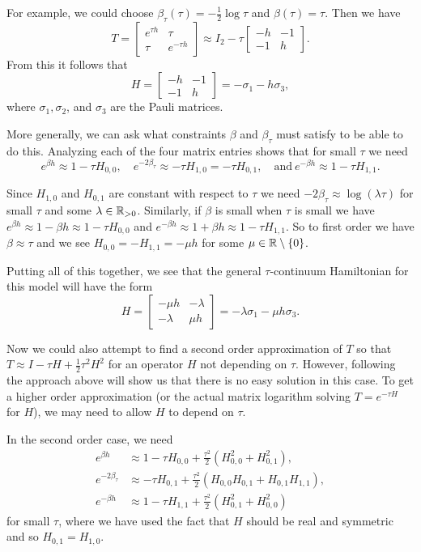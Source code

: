 \documentclass[11pt,reqno]{amsart}
\begin{document}
	For example, we could choose $\beta_\tau(\tau)=-\frac{1}{2}\log \tau$ and $\beta(\tau)=\tau$. Then we have \[T=\begin{bmatrix}
	e^{\tau h} & \tau \\
	\tau & e^{-\tau h}
	\end{bmatrix} \approx I_2-\tau\begin{bmatrix}
	-h & -1 \\
	-1 & h
	\end{bmatrix}.\] 
	From this it follows that \[H=\begin{bmatrix}
	-h & -1 \\
	-1 & h
	\end{bmatrix}=-\sigma_1-h\sigma_3, \] where $\sigma_1,\sigma_2$, and $\sigma_3$ are the Pauli matrices. 
	
	More generally, we can ask what constraints $\beta$ and $\beta_\tau$ must satisfy to be able to do this. 
	Analyzing each of the four matrix entries shows that for small $\tau$ we need 
	\[e^{\beta h} \approx 1-\tau H_{0,0}, \quad e^{-2\beta_\tau} \approx -\tau H_{1,0}=-\tau H_{0,1},\quad \text{and} \ e^{-\beta h} \approx 1- \tau H_{1,1}. \]
	
	Since $H_{1,0}$ and $H_{0,1}$ are constant with respect to $\tau$ we need $-2\beta_\tau \approx \log (\lambda\tau)$ for small $\tau$ and some $\lambda\in \mathbb{R}_{>0}$. 
	Similarly, if $\beta$ is small when $\tau$ is small we have $e^{\beta h} \approx 1-\beta h \approx 1-\tau H_{0,0}$ and $e^{-\beta h} \approx 1+\beta h \approx 1-\tau H_{1,1}$. 
	So to first order we have $\beta \approx \tau$ and we see $H_{0,0}=-H_{1,1}=-\mu h$ for some $\mu \in \mathbb{R}\setminus\{0\}$. 
	
	Putting all of this together, we see that the general $\tau$-continuum Hamiltonian for this model will have the form 
	\[ H=\begin{bmatrix}
	-\mu h & -\lambda \\
	-\lambda & \mu h
	\end{bmatrix}=-\lambda\sigma_1-\mu h\sigma_3.\]
	
	Now we could also attempt to find a second order approximation of $T$ so that $T\approx I - \tau H + \frac{1}{2}\tau^2 H^2$ for an operator $H$ not depending on $\tau$. 
	However, following the approach above will show us that there is no easy solution in this case.  
	To get a higher order approximation (or the actual matrix logarithm solving $T=e^{-\tau H}$ for $H$), we may need to allow $H$ to depend on $\tau$. 
	
	In the second order case, we need 
	\begin{align*}
		e^{\beta h} &\approx 1- \tau H_{0,0}+\frac{\tau^2}{2}(H_{0,0}^2+H_{0,1}^2),\\
		e^{-2\beta_\tau} &\approx -\tau H_{0,1}+\frac{\tau^2}{2}(H_{0,0}H_{0,1}+H_{0,1}H_{1,1}),\\
		e^{-\beta h} &\approx 1 - \tau H_{1,1}+\frac{\tau^2}{2}(H_{0,1}^2+H_{0,0}^2)
	\end{align*}
	for small $\tau$, where we have used the fact that $H$ should be real and symmetric and so $H_{0,1}=H_{1,0}$.
	
\end{document}

